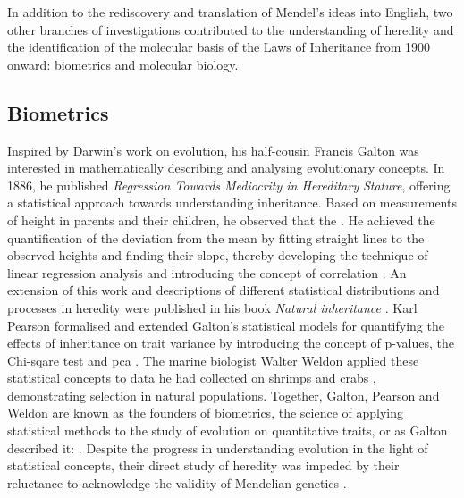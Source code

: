 In addition to the rediscovery and translation of Mendel's ideas into English, two other branches of investigations contributed to the understanding of heredity and the identification of the molecular basis of the Laws of Inheritance from 1900 onward: biometrics and molecular biology. 

\subsection{Biometrics}
Inspired by Darwin's work on evolution, his half-cousin Francis Galton was interested in mathematically describing and analysing evolutionary concepts. In 1886, he published  \textit{Regression Towards Mediocrity in Hereditary} \textit{Stature}, offering a statistical approach towards understanding inheritance. Based on measurements of height in parents and their children, he observed that the . He achieved the quantification of the deviation from the mean by fitting straight lines to the observed heights and finding their slope, thereby developing the technique of linear regression analysis and introducing the concept of correlation \citep{Galton1886}. An extension of this work and descriptions of different statistical distributions and processes in heredity were published in his book \textit{Natural inheritance} \citep{Galton1889}. Karl Pearson formalised and extended Galton's statistical models for quantifying the effects of inheritance on trait variance by introducing the concept of p-values, the Chi-sqare test and \gls{pca} \citep{Pearson1900,Pearson1901}. The marine biologist Walter Weldon applied these statistical concepts to data he had collected on shrimps and crabs \citep{Weldon1890, Weldon1892}, demonstrating selection in natural populations. Together, Galton, Pearson and Weldon are known as the founders of biometrics, the science of applying statistical methods to the study of evolution on quantitative traits, or as Galton described it:  \citep[editorial]{Galton1901}. Despite the progress in understanding evolution in the light of statistical concepts, their direct study of heredity was impeded by their reluctance to acknowledge the validity of Mendelian genetics \citep{Bulmer2003}.

